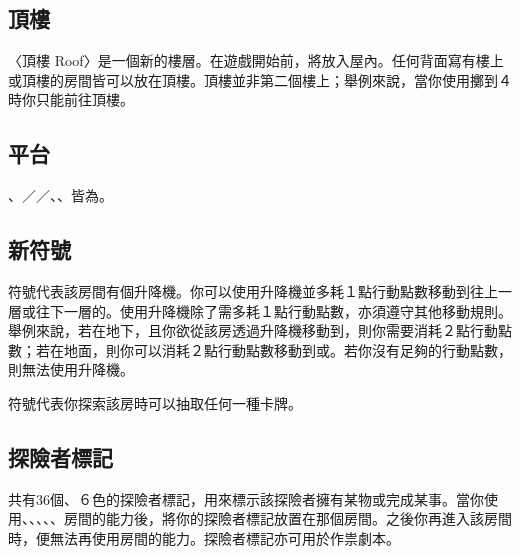 
\subsection{頂樓}

〈頂樓 Roof〉是一個新的樓層。在遊戲開始前，將放入屋內。任何背面寫有樓上或頂樓的房間皆可以放在頂樓。頂樓並非第二個樓上；舉例來說，當你使用擲到４時你只能前往頂樓。


\subsection{平台}

、／／、、皆為。


\subsection{新符號}

\DumbwaiterSymbol{}符號代表該房間有個升降機。你可以使用升降機並多耗１點行動點數移動到往上一層或往下一層的。使用升降機除了需多耗１點行動點數，亦須遵守其他移動規則。舉例來說，若在地下，且你欲從該房透過升降機移動到，則你需要消耗２點行動點數；若在地面，則你可以消耗２點行動點數移動到或。若你沒有足夠的行動點數，則無法使用升降機。

\QuestionSymbol{}符號代表你探索該房時可以抽取任何一種卡牌。


\subsection{探險者標記}

共有36個、６色的探險者標記，用來標示該探險者擁有某物或完成某事。當你使用、、、、、房間的能力後，將你的探險者標記放置在那個房間。之後你再進入該房間時，便無法再使用房間的能力。探險者標記亦可用於作祟劇本。

